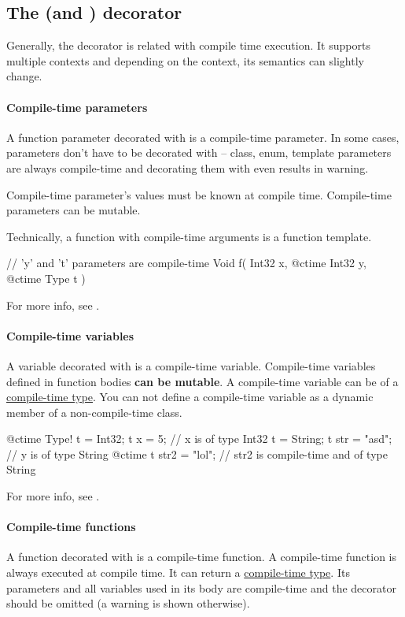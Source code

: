 \subsection{The  (and ) decorator} \label{decorator:ctime}
Generally, the  decorator is related with compile time execution. It supports multiple contexts and depending on the context, its semantics can slightly change.

\paragraph{Compile-time parameters}
A function parameter decorated with  is a compile-time parameter. In some cases, parameters don't have to be decorated with  -- class, enum, template parameters are always compile-time and decorating them with  even results in warning.

Compile-time parameter's values must be known at compile time. Compile-time parameters can be mutable.

Technically, a function with compile-time arguments is a function template.

\begin{code}
// 'y' and 't' parameters are compile-time
Void f( Int32 x, @ctime Int32 y, @ctime Type t ) {
	
}
\end{code}

For more info, see .

\paragraph{Compile-time variables}
A variable decorated with  is a compile-time variable. Compile-time variables defined in function bodies \textbf{can be mutable}. A compile-time variable can be of a \hyperref[ctime:class]{compile-time type}. You can not define a compile-time variable as a dynamic member of a non-compile-time class.

\begin{code}
@ctime Type! t = Int32;
t x = 5; // x is of type Int32
t = String;
t str = "asd"; // y is of type String
@ctime t str2 = "lol"; // str2 is compile-time and of type String
\end{code}

For more info, see .

\paragraph{Compile-time functions}
A function decorated with  is a compile-time function. A compile-time function is always executed at compile time. It can return a \hyperref[ctime:class]{compile-time type}. Its parameters and all variables used in its body are compile-time and the  decorator should be omitted (a warning is shown otherwise).

